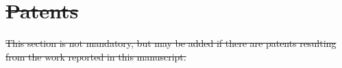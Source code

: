 \documentclass[sensors,article,submit,pdftex,moreauthors]{Definitions/mdpi}
\providecommand{\DIFdel}[1]{{\protect\color{red}\protect\scriptsize\protect\sout{#1}}} %
\providecommand{\DIFdelbegin}{} %
\providecommand{\DIFdelend}{} %
\begin{document}
\DIFdelbegin \section{\DIFdel{Patents}}
\addtocounter{section}{-1}%
\DIFdelend %

\DIFdelbegin \DIFdel{This section is not mandatory, but may be added if there are patents resulting from the work reported in this manuscript.
}%

\DIFdelend %
\vspace{6pt} 




\end{document}
